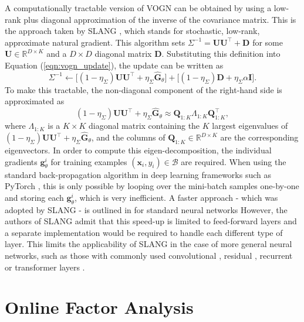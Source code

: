 \documentclass[msc,deptreport.inf]{infthesis} %
\newcommand{\matr}[1]{\mathbf{#1}}
\newcommand{\R}{\mathbb R}
\begin{document}
A computationally tractable version of VOGN can be obtained by using a low-rank plus diagonal approximation of the inverse of the covariance matrix. This is the approach taken by SLANG \cite{mishkin2018}, which stands for stochastic, low-rank, approximate natural gradient. This algorithm sets $\Sigma^{-1} = \matr{U} \matr{U}^\intercal + \matr{D}$ for some $\matr{U} \in \R^{D \times K}$ and a $D \times D$ diagonal matrix $\matr{D}$. Substituting this definition into Equation (\ref{eqn:vogn_update}), the update can be written as
\begin{equation}
	\Sigma^{-1} \leftarrow 
	\big[(1 - \eta_\Sigma) \matr{U} \matr{U}^\intercal + \eta_\Sigma \hat{\matr{G}}_\theta \big] 
	+ \big[(1 - \eta_\Sigma) \matr{D} + \eta_\Sigma \alpha \matr{I}\big].
\end{equation}
To make this tractable, the non-diagonal component of the right-hand side is approximated as
\begin{equation}
	(1 - \eta_\Sigma) \matr{U} \matr{U}^\intercal + \eta_\Sigma \hat{\matr{G}}_\theta 
	\approx \matr{Q}_{1:K} \Lambda_{1:K} \matr{Q}_{1:K}^\intercal,
\end{equation}
where $\Lambda_{1:K}$ is a $K \times K$ diagonal matrix containing the $K$ largest eigenvalues of $(1 - \eta_\Sigma) \matr{U} \matr{U}^\intercal + \eta_\Sigma \hat{\matr{G}}_\theta$, and the columns of $\matr{Q}_{1:K} \in \R^{D \times K}$ are the corresponding eigenvectors. In order to compute this eigen-decomposition, the individual gradients $\matr{g}_\theta^i$ for training examples  $(\matr{x}_i, y_i) \in \mathcal{B}$ are required. When using the standard back-propagation algorithm in deep learning frameworks such as PyTorch \cite{paszke2019}, this is only possible by looping over the mini-batch samples one-by-one and storing each $\matr{g}_\theta^i$, which is very inefficient. A faster approach - which was adopted by SLANG - is outlined in \cite{goodfellow2015} for standard neural networks However, the authors of SLANG admit that this speed-up is limited to feed-forward layers and a separate implementation would be required to handle each different type of layer. This limits the applicability of SLANG in the case of more general neural networks, such as those with commonly used convolutional \cite{krizhevsky09}, residual \cite{he2015}, recurrent \cite{hochreiter1997} or transformer layers \cite{vaswani2017}.  


\chapter{Online Factor Analysis}\label{ch:online_fa}
\end{document}
